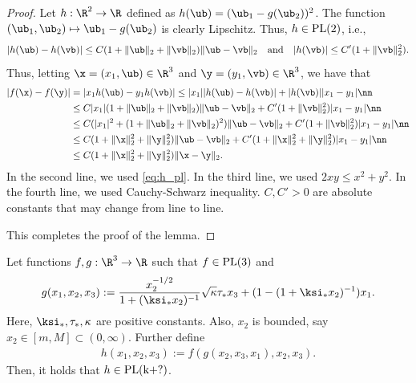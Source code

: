 \begin{proof}
Let $h:\R^2\rightarrow\R$ defined as $h(\ub)=(\ub_1-g(\ub_2))^2$. The function $(\ub_1,\ub_2)\mapsto\ub_1-g(\ub_2)$ is clearly Lipschitz. Thus, $h\in\rm{PL}(2)$, i.e., 
\begin{align}
|h(\ub)-h(\vb)| \leq C(1+\|\ub\|_2+\|\vb\|_2)\|\ub-\vb\|_2\quad\text{and}\quad |h(\vb)|\leq C'(1+\|\vb\|_2^2).\label{eq:h_pl}
\end{align} 
Thus, letting $\x=(x_1,\ub)\in\R^3$ and $\y=(y_1,\vb)\in\R^3$, we have that 
\begin{align}
|f(\x)-f(\y)| &= |x_1h(\ub) - y_1h(\vb)| \leq |x_1||h(\ub)-h(\vb)| + |h(\vb)| |x_1-y_1|\nn\\
&\leq C|x_1|(1+\|\ub\|_2+\|\vb\|_2)\|\ub-\vb\|_2 + C'(1+\|\vb\|_2^2)|x_1-y_1| \nn\\
&\leq C(|x_1|^2+(1+\|\ub\|_2+\|\vb\|_2)^2)\|\ub-\vb\|_2 + C'(1+\|\vb\|_2^2)|x_1-y_1| \nn\\
&\leq C(1+\|\x\|_2^2+\|\y\|_2^2)\|\ub-\vb\|_2 + C'(1+\|\x\|_2^2+\|\y\|_2^2)|x_1-y_1| \nn\\
&\leq C(1+\|\x\|_2^2+\|\y\|_2^2)\|\x-\y\|_2.
\end{align}
In the second line, we used \eqref{eq:h_pl}. In the third line, we used $2xy\leq x^2+y^2$. In the fourth line, we used Cauchy-Schwarz inequality. $C,C'>0$ are absolute constants that may change from line to line.

This completes the proof of the lemma.
\end{proof}



\begin{lemma}
Let functions $f,g:\R^3\rightarrow\R$ such that $f\in\rm{PL}(3)$ and 
$$
g(x_1,x_2,x_3) := \frac{x_2^{-1/2}}{1+(\ksi_* x_2)^{-1}}\sqrt{\kappa}\tau_* x_3 + (1-(1+\ksi_*x_2)^{-1})x_1.
$$
Here, $\ksi_*,\tau_*,\kappa$ are positive constants. Also, $x_2$ is bounded, say $x_2\in[m,M]\subset(0,\infty)$.
Further define 
\begin{align}
h(x_1,x_2,x_3) := f\left(g(x_2,x_3,x_1),x_2,x_3\right).
\end{align}
Then, it holds that $h\in\rm{PL}(k+?)$.
\end{lemma}

























